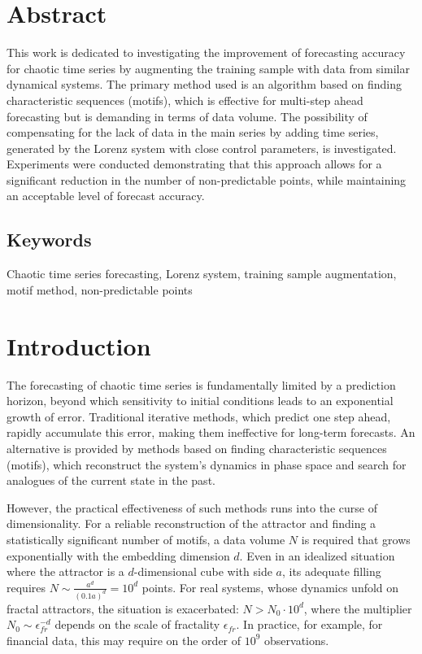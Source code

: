 \documentclass[a4paper,12pt]{extarticle}
\begin{document}
\newpage\section*{Abstract}
This work is dedicated to investigating the improvement of forecasting accuracy for
chaotic time series by augmenting the training sample with data
from similar dynamical systems. The primary method used is an
algorithm based on finding characteristic sequences (motifs),
which is effective for multi-step ahead forecasting but is
demanding in terms of data volume. The possibility of compensating for the
lack of data in the main series by adding time series,
generated by the Lorenz system with close control parameters, is investigated.
Experiments were conducted demonstrating that this approach allows for
a significant reduction in the number of non-predictable points, while
  maintaining an acceptable level of forecast accuracy.
  \subsection*{Keywords}
Chaotic time series forecasting, Lorenz system,
training sample augmentation, motif method, non-predictable points

\newpage
\tableofcontents
\newpage
\section{Introduction}
The forecasting of chaotic time series is fundamentally limited by a
 prediction horizon, beyond which sensitivity
  to initial conditions leads to an exponential growth of error. \cite{MalinetskiyPotapov2002, Gilmore1984}
  Traditional iterative methods, which predict one step ahead,
   rapidly accumulate this error, making them ineffective for long-term
    forecasts. An alternative is provided by methods based on finding characteristic
    sequences (motifs), which reconstruct the system's dynamics in
    phase space and search for analogues of the current state in the past.

However, the practical effectiveness of such methods runs into the curse of
dimensionality. For a reliable reconstruction of the attractor and finding a statistically
 significant number of motifs, a data volume $N$ is required that grows exponentially
  with the embedding dimension $d$. Even in an idealized situation where the attractor
   is a $d$-dimensional cube with side $a$, its adequate filling
    requires $N \sim \frac{a^d}{(0.1a)^d} = 10^d$ points. For real systems,
    whose dynamics unfold on fractal attractors, the situation is exacerbated:
     $N > N_0 \cdot 10^d$, where the multiplier $N_0 \sim \epsilon_{fr}^{-d}$ depends
     on the scale of fractality $\epsilon_{fr}$. In practice, for example, for financial
      data, this may require on the order of $10^9$ observations.
\end{document}
